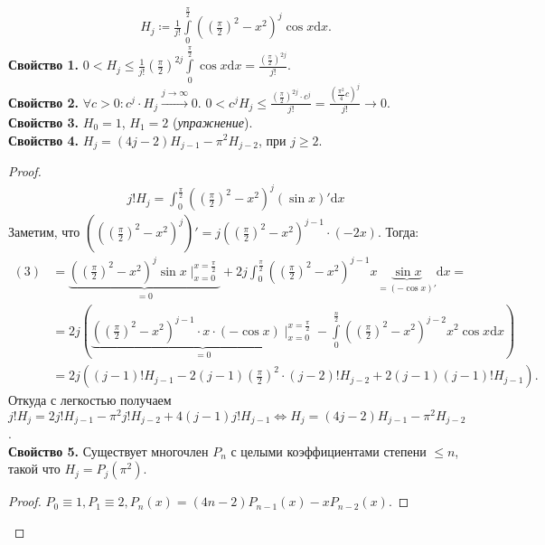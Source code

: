 \begin{example}
    \begin{align}
    H_j \coloneqq \frac{1}{j!} \int\limits_0^{\frac{\pi}{2}}\left(\left(\frac{\pi}{2}\right)^2 - x^2\right)^j \cos x \mathrm{d}x.
    \end{align}
    \textbf{Свойство 1.} $0 < H_j \le \frac{1}{j!}\left(\frac{\pi}{2}\right)^{2j} \int\limits_0^{\frac{\pi}{2}} \cos x \mathrm{d}x = \frac{\left(\frac{\pi}{2}\right)^{2j}}{j!}$.\\
    \textbf{Свойство 2.} $\forall c > 0\!: c^j \cdot H_j \xrightarrow{j \to \infty} 0$.  $0 < c^j H_j \le \frac{\left(\frac{\pi}{2}\right)^{2j} \cdot c^j}{j!} = \frac{\left(\frac{\pi^2}{4}c\right)^j}{j!} \to 0$.\\
    \textbf{Свойство 3.} $H_0 = 1$,  $H_1 = 2$ (\textit{упражнение}).\\
    \textbf{Свойство 4.} $H_j = (4j - 2) H_{j-1} - \pi^2 H_{j-2}$, при  $j \ge 2$.
\end{example}
\begin{proof}
\begin{align}
    j! H_j = \int_0^{\frac{\pi}{2}} \left(\left(\frac{\pi}{2}\right)^2 - x^2\right)^j (\sin x)' \mathrm{d}x
\end{align}
Заметим, что $\left(\left(\left(\frac{\pi}{2}\right)^2 - x^2\right)^j\right)' = j \left(\left(\frac{\pi}{2}\right)^2 - x^2\right)^{j-1} \cdot (-2x)$. Тогда: \begin{align*}
    (3) &= \underbrace{\left(\left( \frac{\pi}{2} \right)^2 - x^2\right)^j \sin x \mid_{x = 0}^{x = \frac{\pi}{2}}}_{=0} + 2j \int_{0}^{\frac{\pi}{2}}\left(\left(\frac{\pi}{2}\right)^2 - x^2\right)^{j-1} x \underbrace{\sin x}_{=(-\cos x)'} \mathrm{d} x = \\
        &= 2j \left(\underbrace{\left(\left(\frac{\pi}{2}\right)^2 - x^2\right)^{j-1} \cdot x \cdot (- \cos x) \mid_{x=0}^{x=\frac{\pi}{2}}}_{=0} - \int\limits_0^{\frac{n}{2}} \left(\left(\frac{\pi}{2}\right)^2 - x^2\right)^{j-2} x^2 \cos x \mathrm{d} x\right) \\
        &= 2j\left((j-1)! H_{j-1} - 2(j-1)\left(\frac{\pi}{2}\right)^2 \cdot (j-2)! H_{j-2} + 2(j-1)(j-1)! H_{j-1}\right)
.\end{align*}
Откуда с легкостью получаем $j! H_j = 2j! H_{j-1} - \pi^2 j! H_{j-2} + 4(j-1)j! H_{j-1} \iff H_j = (4j-2)H_{j-1} - \pi^2 H_{j-2}$.\\
\textbf{Свойство 5.} Существует многочлен $P_n$ с целыми коэффициентами степени $\le n$, такой что $H_j = P_j(\pi^2)$.
\begin{proof}
    $P_0 \equiv 1, P_1 \equiv 2, P_n(x) = (4n-2)P_{n-1}(x) - xP_{n-2}(x)$.
\end{proof}
\end{proof}
